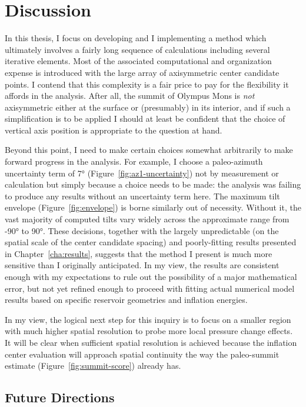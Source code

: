 \chapter{Discussion}\label{cha:discussion}

In this thesis, I focus on developing and I implementing a method which ultimately involves a fairly long sequence of calculations including several iterative elements. Most of the associated computational and organization expense is introduced with the large array of axisymmetric center candidate points. I contend that this complexity is a fair price to pay for the flexibility it affords in the analysis. After all, the summit of Olympus Mons is \emph{not} axisymmetric either at the surface or (presumably) in its interior, and if such a simplification is to be applied I should at least be confident that the choice of vertical axis position is appropriate to the question at hand.

Beyond this point, I need to make certain choices somewhat arbitrarily to make forward progress in the analysis. For example, I choose a paleo-azimuth uncertainty term of \ang{7} (Figure~\ref{fig:az1-uncertainty}) not by measurement or calculation but simply because a choice needs to be made: the analysis was failing to produce any results without an uncertainty term here. The maximum tilt envelope (Figure~\ref{fig:envelope}) is borne similarly out of necessity. Without it, the vast majority of computed tilts vary widely across the approximate range from \ang{-90} to \ang{90}. These decisions, together with the largely unpredictable (on the spatial scale of the center candidate spacing) and poorly-fitting results presented in Chapter~\ref{cha:results}, suggests that the method I present is much more sensitive than I originally anticipated. In my view, the results are consistent enough with my expectations to rule out the possibility of a major mathematical error, but not yet refined enough to proceed with fitting actual numerical model results based on specific reservoir geometries and inflation energies.

In my view, the logical next step for this inquiry is to focus on a smaller region with much higher spatial resolution to probe more local pressure change effects. It will be clear when sufficient spatial resolution is achieved because the inflation center evaluation will approach spatial continuity the way the paleo-summit estimate (Figure~\ref{fig:summit-score}) already has.

\section{Future Directions}

